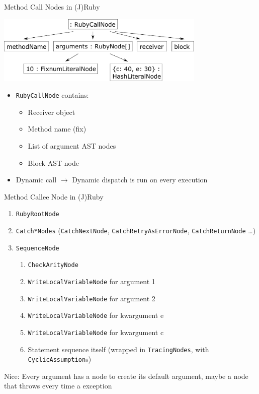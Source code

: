 \documentclass[xcolor=dvipsname,handout]{beamer} %
\begin{document}
\begin{frame}{Method Call Nodes in (J)Ruby}
\begin{table}
    \centering
    \includegraphics[width=0.75\textwidth]{kwarg_1.pdf}
\end{table}

\begin{itemize}
    \item \lstinline{RubyCallNode} contains:
      \begin{itemize}
      \item Receiver object
      \item Method name (fix)
      \item List of argument AST nodes
      \item Block AST node
      \end{itemize}
    \item Dynamic call $\rightarrow$ Dynamic dispatch is run on every execution
\end{itemize}
\end{frame}

\begin{frame}{Method Callee Node in (J)Ruby}
\begin{enumerate}
 \item \lstinline{RubyRootNode}
 \item \lstinline{Catch*Nodes} (\lstinline{CatchNextNode}, \lstinline{CatchRetryAsErrorNode}, \lstinline{CatchReturnNode} \dots)
 \item \lstinline{SequenceNode} \begin{enumerate}
    \item \lstinline{CheckArityNode}
    \item \lstinline{WriteLocalVariableNode} for argument 1
    \item \lstinline{WriteLocalVariableNode} for argument 2
    \item \lstinline{WriteLocalVariableNode} for kwargument e
    \item \lstinline{WriteLocalVariableNode} for kwargument c
    \item Statement sequence itself (wrapped in \lstinline{TracingNodes}, with \lstinline{CyclicAssumption}s)
  \end{enumerate}
\end{enumerate}
Nice: Every argument has a node to create its default argument, maybe a node that throws every time a exception
\end{frame}
\end{document}
